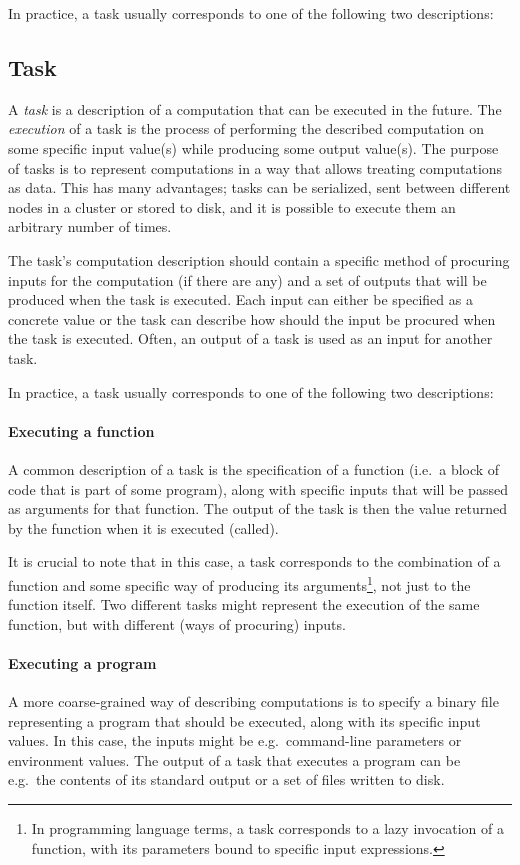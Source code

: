 In practice, a task usually corresponds to one of the following two descriptions:


\subsection{Task}
A \emph{task} is a description of a computation that can be executed in the future. The
\textit{execution} of a task is the process of performing the described computation on some
specific input value(s) while producing some output value(s). The purpose of tasks is to represent
computations in a way that allows treating computations as data. This has many advantages; tasks
can be serialized, sent between different nodes in a cluster or stored to disk, and it is possible
to execute them an arbitrary number of times.

The task's computation description should contain a specific method of procuring inputs for the
computation (if there are any) and a set of outputs that will be produced when the task is
executed. Each input can either be specified as a concrete value or the task can describe how
should the input be procured when the task is executed. Often, an output of a task is used as an
input for another task.

In practice, a task usually corresponds to one of the following two descriptions:

\paragraph{Executing a function} A common description of a task is the specification of a
function (i.e.\ a block of code that is part of some program), along with specific inputs that will
be passed as arguments for that function. The output of the task is then the value returned by the
function when it is executed (called).

It is crucial to note that in this case, a task corresponds to the combination of a function and
some specific way of producing its arguments\footnote{In programming language terms, a task corresponds to a lazy invocation of a function, with its parameters bound to specific input expressions.}, not just to the function
itself. Two different tasks might represent the execution of the same function, but with different
(ways of procuring) inputs.

\paragraph{Executing a program} A more coarse-grained way of describing computations is to specify
a binary file representing a program that should be executed, along with its specific input values.
In this case, the inputs might be e.g.\ command-line parameters or environment values. The output
of a task that executes a program can be e.g.\ the contents of its standard output or a set of
files written to disk.

